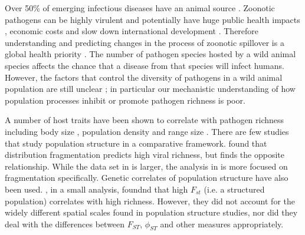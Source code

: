 

Over 50\% of emerging infectious diseases have an animal source \cite{jones2008global, smith2014global}.
Zoonotic pathogens can be highly virulent \cite{luby2009recurrent, lefebvre2014case} and potentially have huge public health impacts \cite{granich2015trends}, economic costs \cite{knobler2004learning} and slow down international development \cite{ebolaWorldbank}.
Therefore understanding and predicting changes in the process of zoonotic spillover is a global health priority \cite{taylor2001risk}.
The number of pathogen species hosted by a wild animal species affects the chance that a disease from that species will infect humans.
However, the factors that control the diversity of pathogens in a wild animal population are still unclear \cite{metcalf2015five}; in particular our mechanistic understanding of how population processes inhibit or promote pathogen richness is poor.






A number of host traits have been shown to correlate with pathogen richness including body size \cite{kamiya2014determines, arneberg2002host}, population density \cite{nunn2003comparative, arneberg2002host} and range size \cite{bordes2011impact, kamiya2014determines}.
There are few studies that study population structure in a comparative framework.
\textcite{maganga2014bat} found that distribution fragmentation predicts high viral richness, but \textcite{gay2014parasite} finds the opposite relationship. 
While the data set in \textcite{gay2014parasite} is larger, the analysis in \cite{maganga2014bat} is more focused on fragmentation specifically.
Genetic correlates of population structure have also been used.
\textcite{turmelle2009correlates}, in a small analysis, foundnd that high $F_{st}$ (i.e. a structured population) correlates with high richness.
However, they did not account for the widely different spatial scales found in population structure studies, nor did they deal with the differences between $F_{ST}$, $\phi_{ST}$ and other measures appropriately. 

